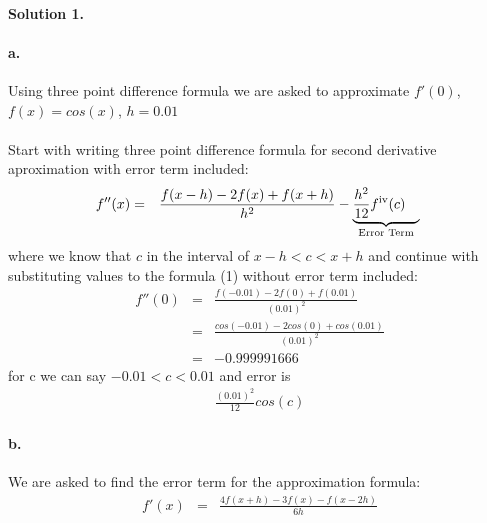 \documentclass[11pt]{article}
\begin{document}
\pagestyle{myheadings}

\paragraph{Solution 1.}
\paragraph{a.} Using three point difference formula we are asked to approximate $f'(0)$, $f(x) = cos(x)$, $h = 0.01$
\paragraph{} Start with writing three point difference formula for second derivative aproximation with error term included:
\begin{eqnarray}
f''(x) &=& \frac{f(x-h) - 2f(x) + f(x+h)}{h^2} -  \underbrace{\frac{h^2}{12}f^\mathrm{\romannumeral 4}(c)\quad}_{\text{Error Term}} \
\end{eqnarray}
where we know that $c$ in the interval of $x-h < c < x+h$ and continue with substituting values to the formula (1) without error term included:
\begin{eqnarray*}
f''(0) &=& \frac{f(-0.01) - 2f(0) + f(0.01)}{(0.01)^2} \\
&=& \frac{cos(-0.01) - 2 cos(0) + cos(0.01)}{(0.01)^2} \\
&=& -0.999991666
\end{eqnarray*}
for c we can say $-0.01 < c < 0.01$ and error is
\begin{eqnarray*}
\frac{(0.01)^2}{12}cos(c)
\end{eqnarray*} 
\paragraph{b.} We are asked to find the error term for the approximation formula:
\begin{eqnarray*}
f'(x) &=& \frac{4f(x+h) - 3f(x) - f(x-2h)}{6h}
\end{eqnarray*}
\end{document}
